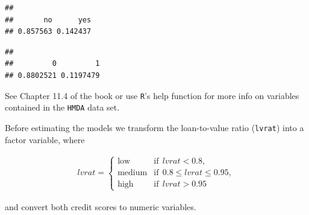 \documentclass[]{book}
\newenvironment{Shaded}{\begin{snugshade}}{\end{snugshade}}
\newcommand{\KeywordTok}[1]{\textcolor[rgb]{0.13,0.29,0.53}{\textbf{#1}}}
\newcommand{\DataTypeTok}[1]{\textcolor[rgb]{0.13,0.29,0.53}{#1}}
\newcommand{\FloatTok}[1]{\textcolor[rgb]{0.00,0.00,0.81}{#1}}
\newcommand{\StringTok}[1]{\textcolor[rgb]{0.31,0.60,0.02}{#1}}
\newcommand{\CommentTok}[1]{\textcolor[rgb]{0.56,0.35,0.01}{\textit{#1}}}
\newcommand{\OperatorTok}[1]{\textcolor[rgb]{0.81,0.36,0.00}{\textbf{#1}}}
\newcommand{\NormalTok}[1]{#1}
\theoremstyle{definition}
\theoremstyle{definition}
\theoremstyle{definition}
\theoremstyle{remark}
\begin{document}
\begin{verbatim}
## 
##       no      yes 
## 0.857563 0.142437
\end{verbatim}

\begin{Shaded}
\end{Shaded}

\begin{verbatim}
## 
##         0         1 
## 0.8802521 0.1197479
\end{verbatim}

See Chapter 11.4 of the book or use \texttt{R}'s help function for more
info on variables contained in the \texttt{HMDA} data set.

Before estimating the models we transform the loan-to-value ratio
(\texttt{lvrat}) into a factor variable, where

\begin{align*}
  lvrat = 
  \begin{cases}
    \text{low} & \text{if} \ \ lvrat < 0.8, \\
    \text{medium} & \text{if} \ \ 0.8 \leq lvrat \leq 0.95, \\
    \text{high} & \text{if} \ \ lvrat > 0.95
  \end{cases}
\end{align*}

and convert both credit scores to numeric variables.

\begin{Shaded}
\end{Shaded}
\end{document}
